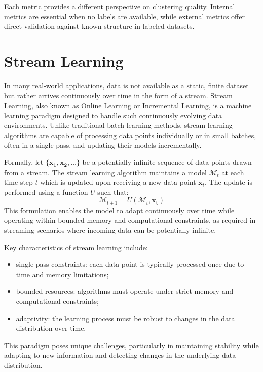 Each metric provides a different perspective on clustering quality. Internal
metrics are essential when no labels are available, while external metrics
offer direct validation against known structure in labeled datasets.

\section{Stream Learning}\label{sec:stream_learning}
In many real-world applications, data is not available as a static, finite
dataset but rather arrives continuously over time in the form of a stream.
Stream Learning, also known as Online Learning or Incremental Learning, is a
machine learning paradigm designed to handle such continuously evolving data
environments. Unlike traditional batch learning methods, stream learning
algorithms are capable of processing data points individually or in small
batches, often in a single pass, and updating their models incrementally.

Formally, let $\{\mathbf{x_1, x_2,\ldots} \} $ be a potentially infinite
sequence of data points drawn from a stream. The stream learning algorithm
maintains a model $\mathcal{M}_t$ at each time step $t$ which is updated upon
receiving a new data point $\mathbf{x}_t$. The update is performed using a
function $U$ such that:
\begin{equation}
    \mathcal{M}_{t+1} = U(\mathcal{M}_t, \mathbf{x_t})
\end{equation}
This formulation enables the model to adapt continuously over time while 
operating within bounded memory and computational constraints, as required 
in streaming scenarios where incoming data can be potentially infinite.

Key characteristics of stream learning include:
\begin{itemize}
    \item single-pass constraints: each data point is typically processed once due to
          time and memory limitations;
    \item bounded resources: algorithms must operate under strict memory and
          computational constraints;
    \item adaptivity: the learning process must be robust to changes in the data
          distribution over time.
\end{itemize}

This paradigm poses unique challenges, particularly in maintaining stability
while adapting to new information and detecting changes in the underlying data
distribution.

